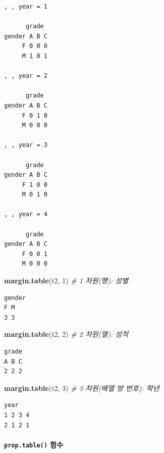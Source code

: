 \documentclass[
  11pt,
]{krantz}
\newenvironment{Shaded}{\begin{snugshade}}{\end{snugshade}}
\newcommand{\CommentTok}[1]{\textcolor[rgb]{0.37,0.37,0.37}{\textit{#1}}}
\newcommand{\DecValTok}[1]{\textcolor[rgb]{0.06,0.06,0.06}{#1}}
\newcommand{\KeywordTok}[1]{\textcolor[rgb]{0.27,0.27,0.27}{\textbf{#1}}}
\newcommand{\NormalTok}[1]{#1}
\begin{document}
\begin{verbatim}
, , year = 1

      grade
gender A B C
     F 0 0 0
     M 1 0 1

, , year = 2

      grade
gender A B C
     F 0 1 0
     M 0 0 0

, , year = 3

      grade
gender A B C
     F 1 0 0
     M 0 1 0

, , year = 4

      grade
gender A B C
     F 0 0 1
     M 0 0 0
\end{verbatim}

\begin{Shaded}
\begin{Highlighting}[]
\KeywordTok{margin.table}\NormalTok{(t2, }\DecValTok{1}\NormalTok{) }\CommentTok{# 1 차원(행): 성별}
\end{Highlighting}
\end{Shaded}

\begin{verbatim}
gender
F M 
3 3 
\end{verbatim}

\begin{Shaded}
\begin{Highlighting}[]
\KeywordTok{margin.table}\NormalTok{(t2, }\DecValTok{2}\NormalTok{) }\CommentTok{# 2 차원(열): 성적}
\end{Highlighting}
\end{Shaded}

\begin{verbatim}
grade
A B C 
2 2 2 
\end{verbatim}

\begin{Shaded}
\begin{Highlighting}[]
\KeywordTok{margin.table}\NormalTok{(t2, }\DecValTok{3}\NormalTok{) }\CommentTok{# 3 차원(배열 방 번호): 학년}
\end{Highlighting}
\end{Shaded}

\begin{verbatim}
year
1 2 3 4 
2 1 2 1 
\end{verbatim}

\normalsize

\hypertarget{table-fun5}{%
\paragraph{\texorpdfstring{\texttt{prop.table()} 함수}{prop.table() 함수}}\label{table-fun5}}
\end{document}
